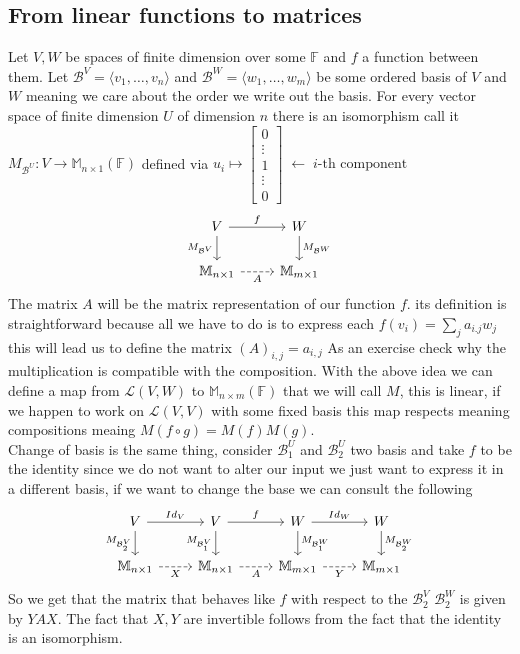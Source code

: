 \documentclass[12pt]{article}
\theoremstyle{definition}
\theoremstyle{remark}
\theoremstyle{plain}
\begin{document}
\subsection{From linear functions to matrices}
Let $V,W$ be spaces of finite dimension over some $\mathbb{F}$ and $f$ a function between them.
Let $\mathcal{B}^V=\langle v_1,\ldots ,v_n\rangle$ and $\mathcal{B}^W=\langle w_1,\ldots ,w_m\rangle$ be some ordered basis of $V$ and $W$ meaning we care about the order we write out the basis.
For every vector space of finite dimension $U$ of dimension $n$ there is an isomorphism call it $M_{\mathcal{B}^U} :V \to \mathbb{M}_{n \times 1}(\mathbb{F})$ defined via $u_i \mapsto
\left[
\begin{array}{c}
0\\
\vdots\\
1\\
\vdots\\
0
\end{array}
\right]
\;\longleftarrow\;
\text{\(i\)-th component}
$
\[\begin{tikzcd}
	V & W \\
	{\mathbb{M}_{n\times1}} & {\mathbb{M}_{m\times1}}
	\arrow["f", from=1-1, to=1-2]
	\arrow["{M_{\mathcal{B}^V}}"', from=1-1, to=2-1]
	\arrow["{M_{\mathcal{B}^W}}", from=1-2, to=2-2]
	\arrow["A"', dashed, from=2-1, to=2-2]
\end{tikzcd}\]
The matrix $A$ will be the matrix representation of our function $f$.
its definition is straightforward because all we have to do is to express each $f(v_i)=\sum\limits_j a_{i.j} w_j$ this will lead us to define the matrix $(A)_{i,j}=a_{i,j}$
As an exercise check why the multiplication is compatible with the composition.
With the above idea we can define a map from $\mathcal{L}(V,W)$ to $\mathbb{M}_{n\times m}(\mathbb{F})$ that we will call $M$, this is linear, if we happen to work on $\mathcal{L}(V,V)$ with some fixed basis this map respects meaning compositions meaing $M(f\circ g)=M(f)M(g)$.
\\
Change of basis is the same thing, consider $\mathcal{B}^U_1$ and $\mathcal{B}^U_2$ two basis and take $f$ to be the identity since we do not want to alter our input we just want to express it in a different basis, if we want to change the base we can consult the following \[\begin{tikzcd}
	V & V & W & W \\
	{\mathbb{M}_{n\times1}} & {\mathbb{M}_{n\times1}} & {\mathbb{M}_{m\times1}} & {\mathbb{M}_{m\times1}}
	\arrow["{Id_V}", from=1-1, to=1-2]
	\arrow["{M_{\mathcal{B}^V_2}}"', from=1-1, to=2-1]
	\arrow["f", from=1-2, to=1-3]
	\arrow["{M_{\mathcal{B}^V_1}}"', from=1-2, to=2-2]
	\arrow["{Id_W}", from=1-3, to=1-4]
	\arrow["{M_{\mathcal{B}^W_1}}", from=1-3, to=2-3]
	\arrow["{M_{\mathcal{B}^W_2}}", from=1-4, to=2-4]
	\arrow["X"', dashed, from=2-1, to=2-2]
	\arrow["A"', dashed, from=2-2, to=2-3]
	\arrow["Y"', dashed, from=2-3, to=2-4]
\end{tikzcd}\]
So we get that the matrix that behaves like $f$ with respect to the $\mathcal{B}^V_2$ $\mathcal{B}^W_2$ is given by $YAX$.
The fact that $X,Y$ are invertible follows from the fact that the identity is an isomorphism.\\
\end{document}
